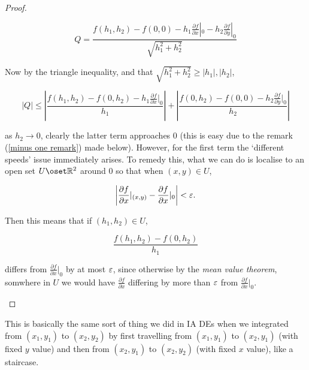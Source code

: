 \documentclass[11pt]{scrartcl}
\begin{document}
\begin{theorem}
\begin{proof}
\begin{example}
                \begin{equation}
                    Q = \frac{f(h_1, h_2) - f(0, 0) - h_1 \frac{\partial f}{\partial x}|_0 - h_2 \frac{\partial f}{\partial y}|_0}{\sqrt{h_1^2 + h_2^2}}
                    \label{Q equation}
                \end{equation}

                Now by the triangle inequality, and that $\sqrt{h_1^2 + h_2^2} \ge |h_1|, |h_2|$,

                \begin{equation}
                    |Q| \le \left| \frac{f(h_1,h_2) - f(0, h_2) - h_1 \frac{\partial f}{\partial x}|_0}{h_1} \right| + \left| \frac{f(0,h_2) - f(0, 0) - h_2 \frac{\partial f}{\partial y}|_0}{h_2} \right|
                \end{equation}

                as $h_2 \to 0$, clearly the latter term approaches 0 (this is easy due to the remark (\ref{minus one remark}) made below). However, for the first term the `different speeds' issue immediately arises. To remedy this, what we can do is localise to an open set $U \oset \RR^2$ around 0 so that when $(x,y) \in U$,

                \begin{equation}
                    \left| \frac{\partial f}{\partial x}|_{(x,y)} - \frac{\partial f}{\partial x}|_0 \right| < \varepsilon.
                \end{equation}

                Then this means that if $(h_1, h_2) \in U$,

                \begin{equation}
                    \frac{f(h_1, h_2) - f(0, h_2)}{h_1}
                \end{equation}

                differs from $\frac{\partial f}{\partial x}|_0$ by at most $\varepsilon$, since otherwise by the \emph{mean value theorem}, somwhere in $U$ we would have $\frac{\partial f}{\partial x}$ differing by more than $\varepsilon$ from $\frac{\partial f}{\partial x}|_0$.

            \end{example}
        \end{proof}
    \label{extracting derivatives}
\end{theorem}

\begin{remark} 
This is basically the same sort of thing we did in IA DEs when we integrated from $(x_1, y_1)$ to $(x_2, y_2)$ by first travelling from $(x_1, y_1)$ to $(x_2, y_1)$ (with fixed $y$ value) and then from $(x_2, y_1)$ to $(x_2, y_2)$ (with fixed $x$ value), like a staircase.
\end{remark}
\end{document}
